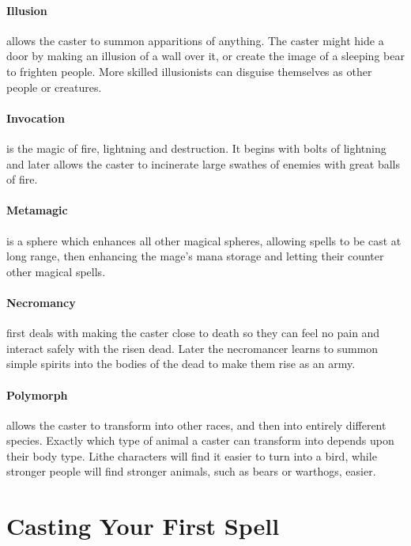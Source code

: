 \begin{multicols}{2}
\paragraph{Illusion} allows the caster to summon apparitions of anything. The caster might hide a door by making an illusion of a wall over it, or create the image of a sleeping bear to frighten people. More skilled illusionists can disguise themselves as other people or creatures.

\paragraph{Invocation} is the magic of fire, lightning and destruction. It begins with bolts of lightning and later allows the caster to incinerate large swathes of enemies with great balls of fire.

\paragraph{Metamagic} is a sphere which enhances all other magical spheres, allowing spells to be cast at long range, then enhancing the mage's mana storage and letting their counter other magical spells.

\paragraph{Necromancy} first deals with making the caster close to death so they can feel no pain and interact safely with the risen dead.
Later the necromancer learns to summon simple spirits into the bodies of the dead to make them rise as an army.

\paragraph{Polymorph} allows the caster to transform into other races, and then into entirely different species.
Exactly which type of animal a caster can transform into depends upon their body type.
Lithe characters will find it easier to turn into a bird, while stronger people will find stronger animals, such as bears or warthogs, easier.

\end{multicols}

\section{Casting Your First Spell}

